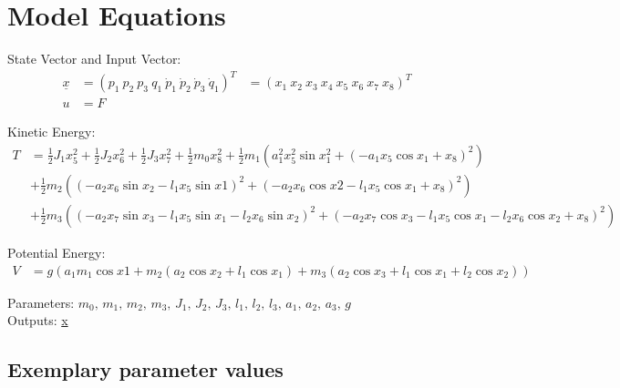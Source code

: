 \documentclass[10pt,a4paper]{article}
\begin{document}
	
	
	\section{Model Equations} %
	
	State Vector and Input Vector:
	\begin{align*}
		\underline{x} &= (p_1 \ p_2 \ p_3 \ q_1 \ \dot{p}_1 \ \dot{p}_2 \ \dot{p}_3 \ \dot{q}_1)^T &= (x_1 \ x_2 \ x_3 \ x_4 \ x_5 \ x_6 \ x_7 \ x_8)^T \\
		u &= F 
	\end{align*}
	
	\noindent Kinetic Energy:			
	\begin{subequations}
	\begin{align*}
		T &= \frac{1}{2}J_1x_5^2 + \frac{1}{2}J_2x_6^2 + \frac{1}{2}J_3x_7^2 + \frac{1}{2}m_0x_8^2 + \frac{1}{2}m_1(a_1^2x_5^2\sin x_1^2 + (-a_1x_5 \cos x_1 + x_8)^2) \\
		& + \frac{1}{2}m_2((-a_2x_6 \sin x_2 - l_1x_5 \sin x1 )^2 + (-a_2x_6 \cos x2 - l_1x_5 \cos x_1 + x_8)^2) \\
		& + \frac{1}{2}m_3((-a_2x_7 \sin x_3 - l_1x_5 \sin x_1 - l_2x_6 \sin x_2)^2 + (-a_2x_7 \cos x_3 - l_1x_5 \cos x_1 - l_2x_6 \cos x_2 + x_8)^2)
	\end{align*}
	\end{subequations}
	
	\noindent Potential Energy:			
	\begin{subequations}
	\begin{align*}
		V &= g(a_1m_1 \cos x1 + m_2(a_2 \cos x_2 + l_1 \cos x_1) + m_3(a_2 \cos x_3 + l_1 \cos x_1 + l_2 \cos x_2))
	\end{align*}
	\end{subequations}

	\noindent
	Parameters: $m_0, \, m_1, \, m_2, \, m_3, \, J_1, \, J_2, \, J_3, \, l_1, \, l_2, \, l_3, \, a_1, \, a_2, \, a_3, \, g$ %
	\\
	Outputs: \underline{x}
	
	
	
	\subsection{Exemplary parameter values}
	
\end{document}
